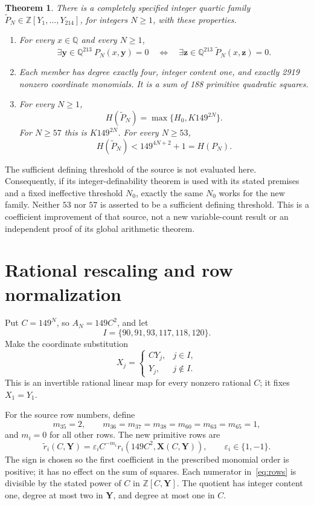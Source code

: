 \documentclass[11pt,a4paper]{article}
\newtheorem{theorem}{Theorem}[section]
\newcommand{\Q}{\mathbb Q}\newcommand{\Z}{\mathbb Z}
\begin{document}
\begin{theorem}\label{thm:main}
There is a completely specified integer quartic family
$\widetilde P_N\in\Z[Y_1,\ldots,Y_{214}]$, for integers $N\ge1$, with
these properties.
\begin{enumerate}
\item For every $x\in\Q$ and every $N\ge1$,
\[
 \exists\boldsymbol y\in\Q^{213}\ P_N(x,\boldsymbol y)=0
 \quad\Longleftrightarrow\quad
 \exists\boldsymbol z\in\Q^{213}\ \widetilde P_N(x,\boldsymbol z)=0.
\]
\item Each member has degree exactly four, integer content one, and exactly
2919 nonzero coordinate monomials. It is a sum of 188 primitive quadratic
squares.
\item For every $N\ge1$,
\[
 H(\widetilde P_N)=\max\{H_0,K149^{2N}\}.
\]
For $N\ge57$ this is $K149^{2N}$. For every $N\ge53$,
\[
 H(\widetilde P_N)<149^{4N+2}+1=H(P_N).
\]
\end{enumerate}
\end{theorem}
The sufficient defining threshold of the source is not evaluated here.
Consequently, if its integer-definability theorem is used with its stated
premises and a fixed ineffective threshold $N_0$, exactly the same
$N_0$ works for the new family. Neither $53$ nor $57$ is asserted to be
a sufficient defining threshold. This is a coefficient improvement of
that source, not a new variable-count result or an independent proof of
its global arithmetic theorem.

\section{Rational rescaling and row normalization}
Put $C=149^N$, so $A_N=149C^2$, and let
\[
 I=\{90,91,93,117,118,120\}.
\]
Make the coordinate substitution
\begin{equation}\label{eq:substitution}
 X_j=\begin{cases}CY_j,&j\in I,\\Y_j,&j\notin I.\end{cases}
\end{equation}
This is an invertible rational linear map for every nonzero rational $C$;
it fixes $X_1=Y_1$.

For the source row numbers, define
\[
 m_{35}=2,\qquad m_{36}=m_{37}=m_{38}=m_{60}=m_{63}=m_{65}=1,
\]
and $m_i=0$ for all other rows. The new primitive rows are
\begin{equation}\label{eq:rows}
 \widetilde r_i(C,\boldsymbol Y)
 =\varepsilon_i C^{-m_i}
 r_i(149C^2,\boldsymbol X(C,\boldsymbol Y)),
 \qquad \varepsilon_i\in\{1,-1\}.
\end{equation}
The sign is chosen so the first coefficient in the prescribed monomial
order is positive; it has no effect on the sum of squares. Each numerator
in~\eqref{eq:rows} is divisible by the stated power of $C$ in
$\Z[C,\boldsymbol Y]$. The quotient has integer content one, degree at
most two in $\boldsymbol Y$, and degree at most one in $C$.
\end{document}
